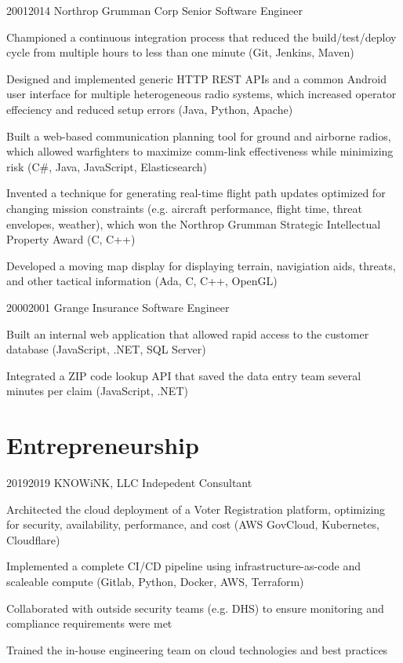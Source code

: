 \documentclass{article}
\begin{document}
\job
  {2001}{2014}
  {Northrop Grumman Corp}
  {Senior Software Engineer}
  {\begin{achievements}
    \item Championed a continuous integration process that reduced the build/test/deploy cycle from multiple hours to less than one minute (Git, Jenkins, Maven)
    \item Designed and implemented generic HTTP REST APIs and a common Android user interface for multiple heterogeneous radio systems, which increased operator effeciency and reduced setup errors (Java, Python, Apache)
    \item Built a web-based communication planning tool for ground and airborne radios, which allowed warfighters to maximize comm-link effectiveness while minimizing risk (C\#, Java, JavaScript, Elasticsearch)
    \item Invented a technique for generating real-time flight path updates optimized for changing mission constraints (e.g. aircraft performance, flight time, threat envelopes, weather), which won the Northrop Grumman Strategic Intellectual Property Award (C, C++)
    \item Developed a moving map display for displaying terrain, navigiation aids, threats, and other tactical information (Ada, C, C++, OpenGL)
  \end{achievements}}

\job
  {2000}{2001}
  {Grange Insurance}
  {Software Engineer}
  {\begin{achievements}
    \item Built an internal web application that allowed rapid access to the customer database (JavaScript, .NET, SQL Server)
    \item Integrated a ZIP code lookup API that saved the data entry team several minutes per claim (JavaScript, .NET)
  \end{achievements}}


\pagebreak


\section{Entrepreneurship}

\job
  {2019}{2019}
  {KNOWiNK, LLC}
  {Indepedent Consultant}
  {\begin{achievements}
    \item Architected the cloud deployment of a Voter Registration platform, optimizing for security, availability, performance, and cost (AWS GovCloud, Kubernetes, Cloudflare)
    \item Implemented a complete CI/CD pipeline using infrastructure-as-code and scaleable compute (Gitlab, Python, Docker, AWS, Terraform)
    \item Collaborated with outside security teams (e.g. DHS) to ensure monitoring and compliance requirements were met
    \item Trained the in-house engineering team on cloud technologies and best practices
  \end{achievements}}
\end{document}
